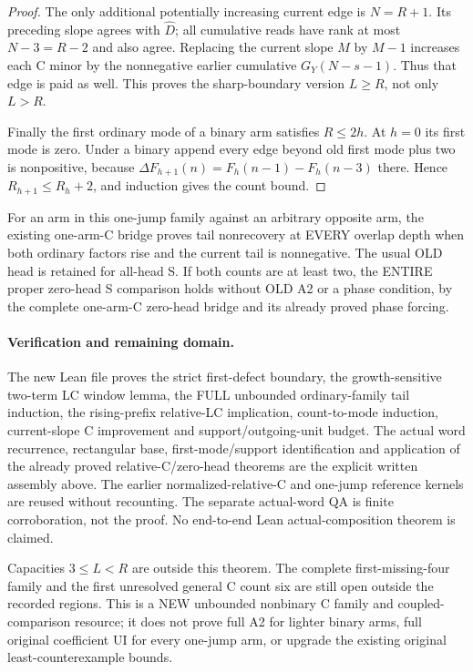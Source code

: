 \begin{proof}
The only additional potentially increasing current edge is
$N=R+1$.  Its preceding slope agrees with $\widehat D$;
all cumulative reads have rank at most $N-3=R-2$ and also agree.
Replacing the current slope $M$ by $M-1$ increases each C minor
by the nonnegative earlier cumulative $G_Y(N-s-1)$.
Thus that edge is paid as well.  This proves the sharp-boundary
version $L\ge R$, not only $L>R$.

Finally the first ordinary mode of a binary arm satisfies $R\le2h$.
At $h=0$ its first mode is zero.  Under a binary append every
edge beyond old first mode plus two is nonpositive, because
$\Delta F_{h+1}(n)=F_h(n-1)-F_h(n-3)$ there.
Hence $R_{h+1}\le R_h+2$, and induction gives the count bound.
\end{proof}

\begin{corollary}
For an arm in this one-jump family against an arbitrary opposite
arm, the existing one-arm-C bridge proves tail nonrecovery at
EVERY overlap depth when both ordinary factors rise and the current
tail is nonnegative.  The usual OLD head is retained for all-head S.
If both counts are at least two, the ENTIRE proper zero-head S
comparison holds without OLD A2 or a phase condition, by the complete
one-arm-C zero-head bridge and its already proved phase forcing.
\end{corollary}

\paragraph{Verification and remaining domain.}
The new Lean file proves the strict first-defect boundary, the
growth-sensitive two-term LC window lemma, the FULL unbounded
ordinary-family tail induction, the rising-prefix relative-LC
implication, count-to-mode induction, current-slope C improvement
and support/outgoing-unit budget.  The actual word recurrence,
rectangular base, first-mode/support identification and application
of the already proved relative-C/zero-head theorems are the explicit
written assembly above.  The earlier normalized-relative-C and
one-jump reference kernels are reused without recounting.
The separate actual-word QA is finite corroboration, not the proof.
No end-to-end Lean actual-composition theorem is claimed.

Capacities $3\le L<R$ are outside this theorem.  The complete
first-missing-four family and the first unresolved general C count
six are still open outside the recorded regions.  This is a NEW
unbounded nonbinary C family and coupled-comparison resource;
it does not prove full A2 for lighter binary arms, full original
coefficient UI for every one-jump arm, or upgrade the existing
original least-counterexample bounds.
